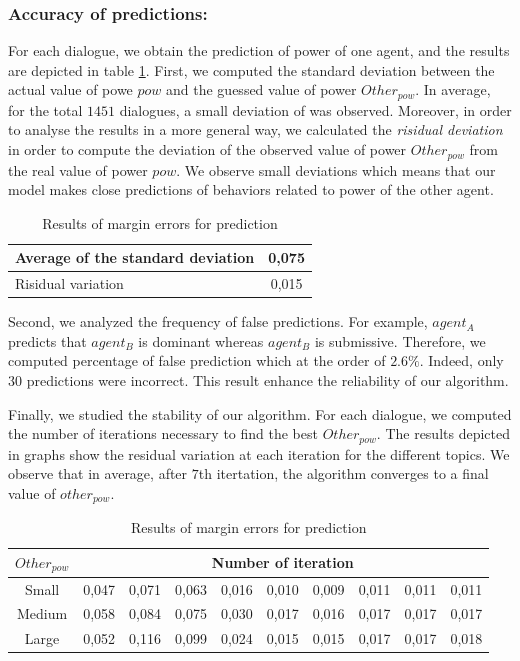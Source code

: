 \documentclass[sigconf]{aamas}  %
\begin{document}
	\subsubsection{Accuracy of predictions:} For each dialogue, we obtain the prediction of power of one agent, and the results are depicted in table \ref{tab:res1}. 
	First, we computed the standard deviation between the actual value of powe $pow$ and the guessed value of power $Other_{pow}$. In average, for the total $1451$ dialogues, a small deviation of was observed. Moreover, in order to analyse the results in a more general way, we calculated the \emph{risidual deviation } in order to compute the deviation of the observed value of power $Other_{pow}$ from the
	real value of power $pow$. 
	We observe small deviations which means that our model makes close predictions of behaviors  related to power of the other agent.
	\begin{table}[h]
		\centering
		\begin{tabular}{|l|c|}
			\hline
			Average of the standard deviation & 0,075 \\
			\hline
			Risidual variation & 0,015 \\
			\hline
		\end{tabular}
		\caption{Results of margin errors for prediction} 
		\label{tab:res1}
	\end{table}
	
	Second, we analyzed the frequency of false predictions. For example, $agent_A$ predicts that $agent_B$ is dominant whereas $agent_B$ is submissive. Therefore, we computed percentage of false prediction which at the order of $ 2.6 \% $. Indeed, only $30$ predictions were incorrect. This result enhance the reliability of our algorithm. 
	
	Finally, we studied the stability of our algorithm. For each dialogue, we computed the number of iterations necessary to find the best $Other_{pow}$. The results depicted in graphs show the residual variation at each iteration for the different topics. We observe that in average, after $7$th itertation, the algorithm converges to a final value of $other_{pow}$.
		\begin{table}[t]
		\begin{tabular}{|c|c|c|c|c|c|c|c|c|c|}
			\hline
			\textbf{$Other_{pow}$} & \multicolumn{9}{c|}{Number of iteration } \\
			\hline
			Small &0,047&0,071&0,063&0,016&0,010&0,009&0,011&0,011&0,011 \\
			\hline
			Medium&0,058&0,084&0,075&0,030&0,017&0,016&0,017&0,017&0,017\\
			\hline
			Large&0,052&0,116&0,099&0,024&0,015&0,015&0,017&0,017&0,018 \\
			\hline
			
		\end{tabular}
		\caption{Results of margin errors for prediction} 
		\label{tab:conv}
	\end{table}
	
\end{document}
